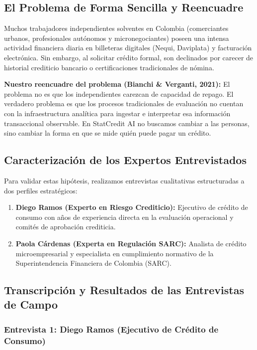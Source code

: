 \documentclass[11pt,a4paper]{article}
\begin{document}
\subsection{El Problema de Forma Sencilla y Reencuadre}

Muchos trabajadores independientes solventes en Colombia (comerciantes urbanos, profesionales autónomos y micronegociantes) poseen una intensa actividad financiera diaria en billeteras digitales (Nequi, Daviplata) y facturación electrónica. Sin embargo, al solicitar crédito formal, son declinados por carecer de historial crediticio bancario o certificaciones tradicionales de nómina.

\textbf{Nuestro reencuadre del problema (Bianchi \& Verganti, 2021):}
El problema no es que los independientes carezcan de capacidad de repago. El verdadero problema es que los procesos tradicionales de evaluación no cuentan con la infraestructura analítica para ingestar e interpretar esa información transaccional observable. En StatCredit AI no buscamos cambiar a las personas, sino cambiar la forma en que se mide quién puede pagar un crédito.

\subsection{Caracterización de los Expertos Entrevistados}

Para validar estas hipótesis, realizamos entrevistas cualitativas estructuradas a dos perfiles estratégicos:

\begin{enumerate}[leftmargin=*]
    \item \textbf{Diego Ramos (Experto en Riesgo Crediticio):} Ejecutivo de crédito de consumo con años de experiencia directa en la evaluación operacional y comités de aprobación crediticia.
    \item \textbf{Paola Cárdenas (Experta en Regulación SARC):} Analista de crédito microempresarial y especialista en cumplimiento normativo de la Superintendencia Financiera de Colombia (SARC).
\end{enumerate}

\subsection{Transcripción y Resultados de las Entrevistas de Campo}

\subsubsection{Entrevista 1: Diego Ramos (Ejecutivo de Crédito de Consumo)}
\end{document}
